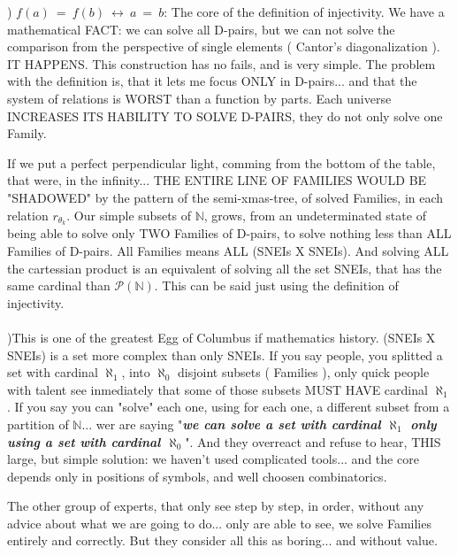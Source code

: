 	) $f(a) \:=\: f(b) \:\leftrightarrow\: a \:=\: b $: The core of the definition of injectivity. We have a mathematical FACT: we can solve all D-pairs, but we can not solve the comparison from the perspective of single elements ( Cantor's diagonalization ). IT HAPPENS. This construction has no fails, and is very simple. The problem with the definition is, that it lets me focus ONLY in D-pairs... and that the system of relations is WORST than a function by parts. Each universe INCREASES ITS HABILITY TO SOLVE D-PAIRS, they do not only solve one Family.
	
	\noindent
	If we put a perfect perpendicular light, comming from the bottom of the table, that were, in the infinity... THE ENTIRE LINE OF FAMILIES WOULD BE "SHADOWED" by the pattern of the semi-xmas-tree, of solved Families, in each relation $r_{\theta_{k}}$. Our simple subsets of $\mathbb{N}$, grows, from an undeterminated state of being able to solve only TWO Families of D-pairs, to solve nothing less than ALL Families of D-pairs. All Families means ALL (SNEIs X SNEIs). And solving ALL the cartessian product is an equivalent of solving all the set SNEIs, that has the same cardinal than $\mathcal{P}(\mathbb{N})$. This can be said just using the definition of injectivity.
	\\\\
	
	)This is one of the greatest Egg of Columbus if mathematics history. (SNEIs X SNEIs) is a set more complex than only SNEIs. If you say people, you splitted a set with cardinal $\aleph_{1}$, into $\aleph_{0}$ disjoint subsets ( Families ), only quick people with talent see inmediately that some of those subsets MUST HAVE cardinal $\aleph_{1}$. If you say you can "solve" each one, using for each one, a different subset from a partition of $\mathbb{N}$... wer are saying "\textbf{\textit{we can solve a set with cardinal $\aleph_{1}$ only using a set with cardinal $\aleph_{0}$}}". And they overreact and refuse to hear, THIS large, but simple solution: we haven't used complicated tools... and the core depends only in positions of symbols, and well choosen combinatorics.

	\noindent
	The other group of experts, that only see step by step, in order, without any advice about what we are going to do... only are able to see, we solve Families entirely and  correctly. But they consider all this as boring... and without value.
	\\\\
	
